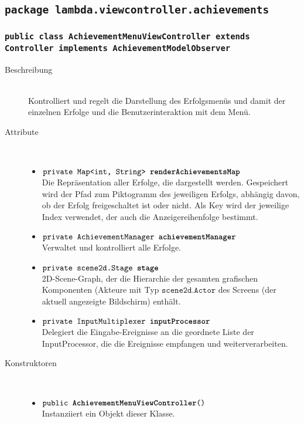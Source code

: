 \subsection{\texttt{package lambda.viewcontroller.achievements}}

\subsubsection{\normalfont \texttt{public class \textbf{AchievementMenuViewController} extends Controller implements AchievementModelObserver}}

\begin{description}
\item[Beschreibung] \hfill \\ Kontrolliert und regelt die Darstellung des Erfolgsmenüs und damit der einzelnen Erfolge und die Benutzerinteraktion mit dem Menü.
\item[Attribute] \hfill \\
	\vspace{-.8cm}
	\begin{itemize}
		\item $\texttt{private Map<int, String> \textbf{renderAchievementsMap}}$ \\ Die Repräsentation aller Erfolge, die dargestellt werden. Gespeichert wird der Pfad zum Piktogramm des jeweiligen Erfolgs, abhängig davon, ob der Erfolg freigeschaltet ist oder nicht. Als Key wird der jeweilige Index verwendet, der auch die Anzeigereihenfolge bestimmt.
		\item $\texttt{private AchievementManager \textbf{achievementManager}}$ \\ Verwaltet und kontrolliert alle Erfolge.
		\item $\texttt{private scene2d.Stage \textbf{stage}}$ \\ 2D-Scene-Graph, der die Hierarchie der gesamten grafischen Komponenten (Akteure mit Typ $\texttt{scene2d.Actor}$ des Screens (der aktuell angezeigte Bildschirm) enthält. 
		\item $\texttt{private InputMultiplexer \textbf{inputProcessor}}$ \\ Delegiert die Eingabe-Ereignisse an die geordnete Liste der InputProcessor, die die Ereignisse empfangen und weiterverarbeiten.
	\end{itemize}
	
\item[Konstruktoren] \hfill \\
	\vspace{-.8cm}
	\begin{itemize}
		\item $\texttt{public \textbf{AchievementMenuViewController}()}$ \\ Instanziiert ein Objekt dieser Klasse.
	\end{itemize}
	

\end{description}
